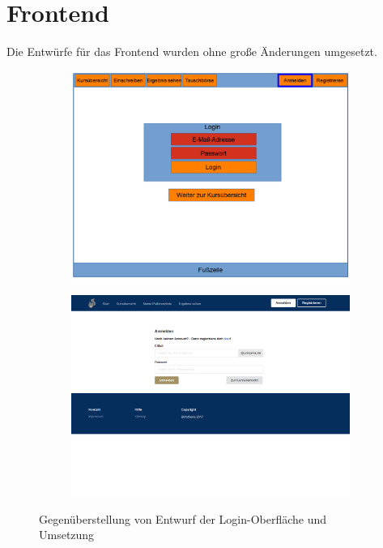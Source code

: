     \section{Frontend}
        Die Entwürfe für das Frontend wurden ohne große Änderungen umgesetzt.
        
	        \begin{figure}[p]
	            \centering
	            \begin{subfigure}{\textwidth}
	            	\centering
	                \includegraphics[width=\textwidth]{./implementation/images/MockUpsFrontend/frontendLogin.png}
	            \end{subfigure}
	            \begin{subfigure}{\textwidth}
	                \includegraphics[trim={5cm 0 5cm 0}, clip, width=\textwidth]{./implementation/images/login.png}
	            \end{subfigure}
	            \caption{Gegenüberstellung von Entwurf der Login-Oberfläche und Umsetzung }
	            \label{fig:comparisonLogin}
	       \end{figure}
	    
